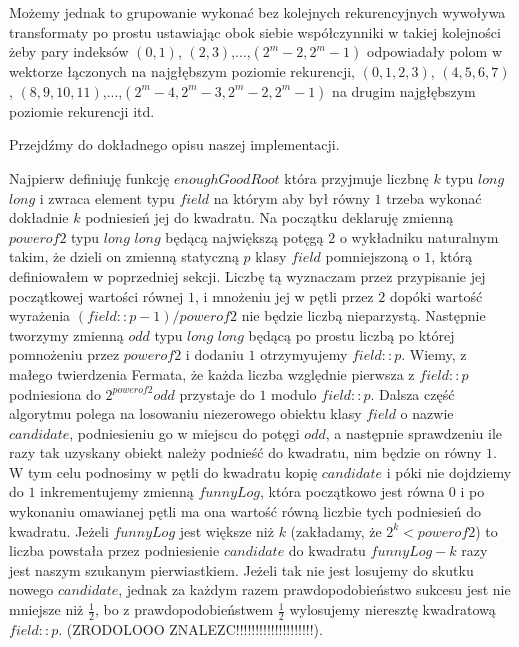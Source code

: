 \documentclass{article}
\begin{document}
Możemy jednak to grupowanie wykonać bez kolejnych rekurencyjnych wywoływa transformaty po prostu ustawiając obok siebie współczynniki w takiej kolejności 
żeby pary indeksów $(0,1)$, $(2,3)$,...,$(2^m-2,2^m-1)$ odpowiadały polom w wektorze łączonych na najgłębszym poziomie rekurencji, $(0,1,2,3)$,
$(4,5,6,7)$, $(8,9,10,11)$,...,$(2^m-4,2^m-3,2^m-2,2^m-1)$ na drugim najgłębszym poziomie rekurencji itd. 

Przejdźmy do dokładnego opisu naszej implementacji. 

Najpierw definiuję funkcję $enoughGoodRoot$ która przyjmuje liczbnę $k$ typu $long$ $long$ i zwraca element typu $field$ na którym aby był równy 
$1$ trzeba wykonać dokładnie $k$ podniesień jej do kwadratu. Na początku deklaruję zmienną $powerof2$ typu $long$ $long$ będącą
największą potęgą $2$ o wykładniku naturalnym takim, że dzieli on zmienną statyczną $p$ klasy $field$ pomniejszoną o $1$, którą definiowałem
w poprzedniej sekcji. Liczbę tą wyznaczam przez przypisanie jej początkowej wartości równej $1$, i mnożeniu jej w pętli przez $2$
dopóki wartość wyrażenia $(field::p-1)/powerof2$ nie będzie liczbą nieparzystą. Następnie tworzymy zmienną $odd$ typu $long$ $long$ będącą po 
prostu liczbą po której pomnożeniu przez $powerof2$ i dodaniu $1$ otrzymyujemy $field::p$. Wiemy, z małego twierdzenia Fermata, że każda liczba względnie 
pierwsza z $field::p$ podniesiona do $2^{powerof2}odd$ przystaje do $1$ modulo $field::p$. Dalsza część algorytmu polega na losowaniu niezerowego obiektu klasy $field$ o nazwie $candidate$,
podniesieniu go w miejscu do potęgi $odd$, a następnie sprawdzeniu ile razy tak uzyskany obiekt należy podnieść do kwadratu, nim będzie on równy $1$. W tym celu podnosimy w pętli do kwadratu
kopię $candidate$ i póki nie dojdziemy do $1$ inkrementujemy zmienną $funnyLog$, która początkowo jest równa $0$ i po wykonaniu omawianej pętli ma ona wartość równą liczbie tych podniesień do kwadratu. Jeżeli $funnyLog$ jest większe niż $k$ (zakładamy, że $2^k<powerof2$) to liczba powstała przez podniesienie $candidate$ do kwadratu $funnyLog-k$ razy
jest naszym szukanym pierwiastkiem. Jeżeli tak nie jest losujemy do skutku nowego $candidate$, jednak za każdym razem prawdopodobieństwo
sukcesu jest nie mniejsze niż $\frac{1}{2}$, bo z prawdopodobieństwem $\frac{1}{2}$ wylosujemy nieresztę kwadratową $field::p$. (ZRODOLOOO ZNALEZC!!!!!!!!!!!!!!!!!!!!).
\end{document}

